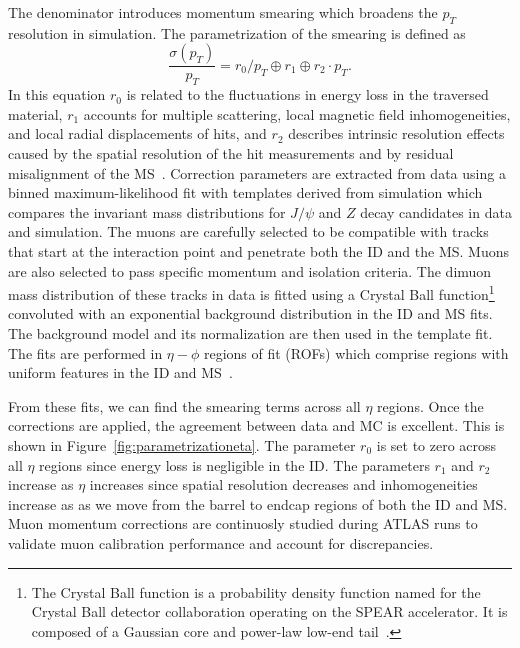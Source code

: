 The denominator introduces momentum smearing which broadens the $p_T$ resolution in simulation. The parametrization of the smearing is defined as
\begin{equation}
    \frac{\sigma(p_T)}{p_T} = r_0/p_T \oplus r_1 \oplus r_2 \cdot p_T .
\end{equation}
In this equation $r_0$ is related to the fluctuations in energy loss in the traversed material, $r_1$ accounts for multiple scattering, local magnetic field inhomogeneities, and local radial displacements of hits, and $r_2$ describes intrinsic resolution effects caused by the spatial resolution of the hit measurements and by residual misalignment of the MS~\cite{MCPpaper}. 
Correction parameters are extracted from data using a binned maximum-likelihood fit with templates derived from simulation which compares the invariant mass distributions for $J/\psi$ and $Z$ decay candidates in data and simulation. The muons are carefully selected to be compatible with tracks that start at the interaction point and penetrate both the ID and the MS. Muons are also selected to pass specific momentum and isolation criteria. The dimuon mass distribution of these tracks in data is fitted using a Crystal Ball function\footnote{The Crystal Ball function is a probability density function named for the Crystal Ball detector collaboration operating on the SPEAR accelerator. It is composed of a Gaussian core and power-law low-end tail~\cite{CrystalBall}.} convoluted with an exponential background distribution in the ID and MS fits. The background model and its normalization are then used in the template fit. The fits are performed in $\eta-\phi$ regions of fit (ROFs) which comprise regions with uniform features in the ID and MS~\cite{MCPpaper}. 

From these fits, we can find the smearing terms across all $\eta$ regions. Once the corrections are applied, the agreement between data and MC is excellent. This is shown in Figure~\ref{fig:parametrizationeta}. The parameter $r_0$ is set to zero across all $\eta$ regions since energy loss is negligible in the ID. The parameters $r_1$ and $r_2$ increase as $\eta$ increases since spatial resolution decreases and inhomogeneities increase as as we move from the barrel to endcap regions of both the ID and MS. Muon momentum corrections are continuosly studied during ATLAS runs to validate muon calibration performance and account for discrepancies.

